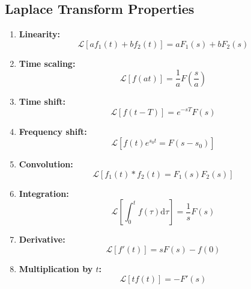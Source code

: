 \documentclass[10pt]{article}
\newcommand{\laplace}{\mathcal{L}}
\newcommand{\dd}{\text{d}}
\begin{document}
\subsection*{Laplace Transform Properties}
\begin{enumerate}[label=\arabic*.]
    \item \textbf{Linearity:}
    \[\boxed{\laplace[af_1(t) + bf_2(t)] = aF_1(s) + bF_2(s)}\]
    \item \textbf{Time scaling:}
    \[\boxed{\laplace[f(at)] = \frac{1}{a} F\left(\frac{s}{a}\right)}\]
    \item \textbf{Time shift:}
    \[\boxed{\laplace[f(t - T)] = e^{-sT} F(s)}\]
    \item \textbf{Frequency shift:}
    \[\boxed{\laplace[f(t) e^{s_0 t} = F(s - s_0)]}\]
    \item \textbf{Convolution:}
    \[\boxed{\laplace[f_1(t) * f_2(t) = F_1(s) F_2(s)]}\]
    \item \textbf{Integration:}
    \[\boxed{\laplace\left[\int_0^t f(\tau) \dd \tau\right] = \frac{1}{s} F(s)}\]
    \item \textbf{Derivative:}
    \[\boxed{\laplace[f'(t)] = sF(s) - f(0)}\]
    \item \textbf{Multiplication by $t$:}
    \[\boxed{\laplace[t f(t)] = -F'(s)}\]
\end{enumerate}
\end{document}
